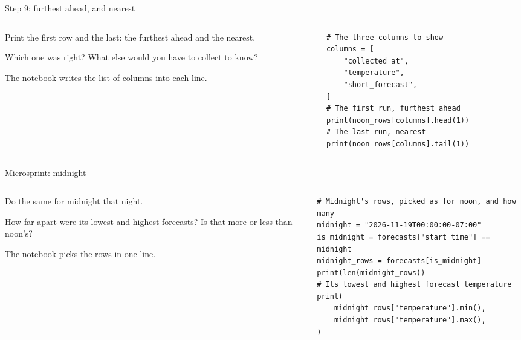\documentclass[9pt,aspectratio=169]{beamer}
\begin{document}
\begin{frame}[fragile]{Step 9: furthest ahead, and nearest}
    \begin{columns}[T]
        \begin{column}{0.37\textwidth}
            Print the first row and the last: the furthest ahead and the nearest.

            \medskip
            Which one was right? What else would you have to collect to know?

            \medskip
            The notebook writes the list of columns into each line.
        \end{column}
        \begin{column}{0.6\textwidth}
\begin{lstlisting}
# The three columns to show
columns = [
    "collected_at",
    "temperature",
    "short_forecast",
]
# The first run, furthest ahead
print(noon_rows[columns].head(1))
# The last run, nearest
print(noon_rows[columns].tail(1))
\end{lstlisting}
        \end{column}
    \end{columns}
\end{frame}

\begin{frame}[fragile]{Microsprint: midnight}
    \begin{columns}[T]
        \begin{column}{0.37\textwidth}
            Do the same for midnight that night.

            \medskip
            How far apart were its lowest and highest forecasts? Is that more or less than noon's?

            \medskip
            The notebook picks the rows in one line.
        \end{column}
        \begin{column}{0.6\textwidth}
\begin{lstlisting}
# Midnight's rows, picked as for noon, and how many
midnight = "2026-11-19T00:00:00-07:00"
is_midnight = forecasts["start_time"] == midnight
midnight_rows = forecasts[is_midnight]
print(len(midnight_rows))
# Its lowest and highest forecast temperature
print(
    midnight_rows["temperature"].min(),
    midnight_rows["temperature"].max(),
)
\end{lstlisting}
        \end{column}
    \end{columns}
\end{frame}
\end{document}
